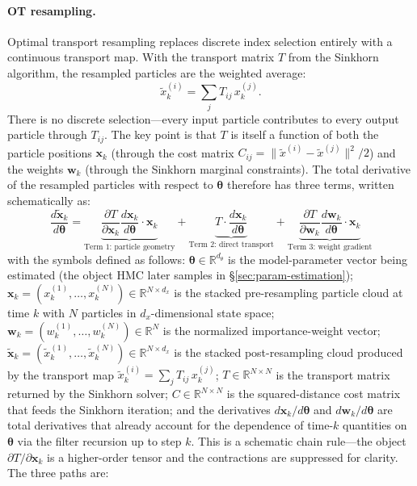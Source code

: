 \documentclass{article}
\renewcommand{\v}[1]{ \ensuremath{ {\mathbf{#1}} }}
\begin{document}
\paragraph{OT resampling.}
Optimal transport resampling \cite{corenflos-differentiable-2021} replaces discrete index selection entirely with a continuous transport map. With the transport matrix $T$ from the Sinkhorn algorithm, the resampled particles are the weighted average:
\begin{equation}
    \tilde{x}_k^{(i)} = \sum_j T_{ij}\, x_k^{(j)}.
\end{equation}
There is no discrete selection---every input particle contributes to every output particle through $T_{ij}$. The key point is that $T$ is itself a function of both the particle positions $\mathbf{x}_k$ (through the cost matrix $C_{ij} = \|\tilde x^{(i)} - \tilde x^{(j)}\|^2/2$) and the weights $\mathbf{w}_k$ (through the Sinkhorn marginal constraints). The total derivative of the resampled particles with respect to $\v\theta$ therefore has three terms, written schematically as:
\begin{equation}
    \frac{d\tilde{\mathbf{x}}_k}{d\v\theta} = \underbrace{\frac{\partial T}{\partial \mathbf{x}_k} \frac{d\mathbf{x}_k}{d\v\theta} \cdot \mathbf{x}_k}_{\text{Term 1: particle geometry}} + \underbrace{T \cdot \frac{d\mathbf{x}_k}{d\v\theta}}_{\text{Term 2: direct transport}} + \underbrace{\frac{\partial T}{\partial \mathbf{w}_k} \frac{d\mathbf{w}_k}{d\v\theta} \cdot \mathbf{x}_k}_{\text{Term 3: weight gradient}}
    \label{eq:ot-three-terms}
\end{equation}
with the symbols defined as follows: $\v\theta \in \mathbb{R}^{d_\theta}$ is the model-parameter vector being estimated (the object HMC later samples in \S\ref{sec:param-estimation}); $\mathbf{x}_k = (x_k^{(1)}, \ldots, x_k^{(N)}) \in \mathbb{R}^{N \times d_x}$ is the stacked pre-resampling particle cloud at time $k$ with $N$ particles in $d_x$-dimensional state space; $\mathbf{w}_k = (w_k^{(1)}, \ldots, w_k^{(N)}) \in \mathbb{R}^{N}$ is the normalized importance-weight vector; $\tilde{\mathbf{x}}_k = (\tilde x_k^{(1)}, \ldots, \tilde x_k^{(N)}) \in \mathbb{R}^{N \times d_x}$ is the stacked post-resampling cloud produced by the transport map $\tilde x_k^{(i)} = \sum_j T_{ij}\, x_k^{(j)}$; $T \in \mathbb{R}^{N \times N}$ is the transport matrix returned by the Sinkhorn solver; $C \in \mathbb{R}^{N \times N}$ is the squared-distance cost matrix that feeds the Sinkhorn iteration; and the derivatives $d\mathbf{x}_k / d\v\theta$ and $d\mathbf{w}_k / d\v\theta$ are total derivatives that already account for the dependence of time-$k$ quantities on $\v\theta$ via the filter recursion up to step $k$. This is a schematic chain rule---the object $\partial T / \partial \mathbf{x}_k$ is a higher-order tensor and the contractions are suppressed for clarity. The three paths are:
\end{document}
